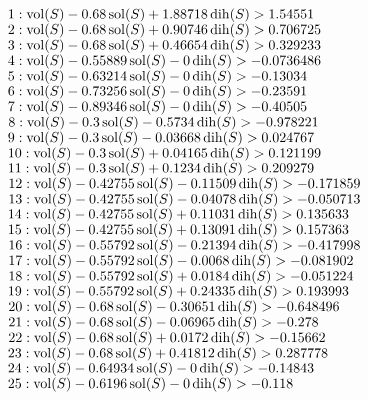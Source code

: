 $1:  \vol(S) - 0.68 \sol(S) + 1.88718 \dih(S) > 1.54551 $\newline
$2:  \vol(S) - 0.68 \sol(S) + 0.90746 \dih(S) > 0.706725$\newline
$3:  \vol(S) - 0.68 \sol(S) + 0.46654 \dih(S) > 0.329233$\newline
$4:  \vol(S) - 0.55889 \sol(S) - 0 \dih(S) > -0.0736486$\newline
$5:  \vol(S) - 0.63214 \sol(S) - 0 \dih(S) > -0.13034$\newline
$6:  \vol(S) - 0.73256 \sol(S) - 0 \dih(S) > -0.23591$\newline
$7:  \vol(S) - 0.89346 \sol(S) - 0 \dih(S) > -0.40505$\newline
$8:  \vol(S) - 0.3 \sol(S) - 0.5734 \dih(S) > -0.978221$\newline
$9:  \vol(S) - 0.3 \sol(S) - 0.03668 \dih(S) > 0.024767$\newline
$10:  \vol(S) - 0.3 \sol(S) + 0.04165 \dih(S) > 0.121199$\newline
$11:  \vol(S) - 0.3 \sol(S) + 0.1234 \dih(S) > 0.209279$\newline
$12:  \vol(S) - 0.42755 \sol(S) - 0.11509 \dih(S) > -0.171859$\newline
$13:  \vol(S) - 0.42755 \sol(S) - 0.04078 \dih(S) > -0.050713$\newline
$14:  \vol(S) - 0.42755 \sol(S) + 0.11031 \dih(S) > 0.135633$\newline
$15:  \vol(S) - 0.42755 \sol(S) + 0.13091 \dih(S) > 0.157363$\newline
$16:  \vol(S) - 0.55792 \sol(S) - 0.21394 \dih(S) > -0.417998$\newline
$17:  \vol(S) - 0.55792 \sol(S) - 0.0068 \dih(S) > -0.081902$\newline
$18:  \vol(S) - 0.55792 \sol(S) + 0.0184 \dih(S) > -0.051224$\newline
$19:  \vol(S) - 0.55792 \sol(S) + 0.24335 \dih(S) > 0.193993$\newline
$20:  \vol(S) - 0.68 \sol(S) - 0.30651 \dih(S) > -0.648496$\newline
$21:  \vol(S) - 0.68 \sol(S) - 0.06965 \dih(S) > -0.278$\newline
$22:  \vol(S) - 0.68 \sol(S) + 0.0172 \dih(S) > -0.15662$\newline
$23:  \vol(S) - 0.68 \sol(S) + 0.41812 \dih(S) > 0.287778$\newline
$24:  \vol(S) - 0.64934 \sol(S) - 0 \dih(S) > -0.14843$\newline
$25:  \vol(S) - 0.6196 \sol(S) - 0 \dih(S) > -0.118$\newline
